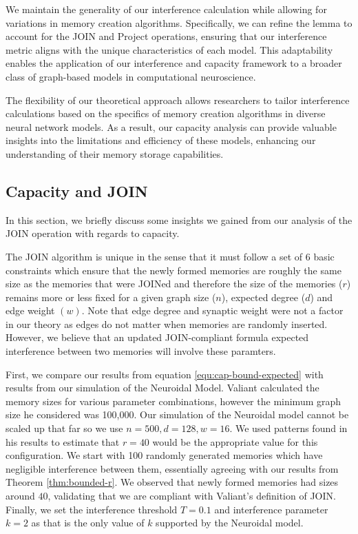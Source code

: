 We maintain the generality of our interference calculation while allowing for variations in memory creation algorithms. Specifically, we can refine the lemma to account for the JOIN and Project operations, ensuring that our interference metric aligns with the unique characteristics of each model. This adaptability enables the application of our interference and capacity framework to a broader class of graph-based models in computational neuroscience.

The flexibility of our theoretical approach allows researchers to tailor interference calculations based on the specifics of memory creation algorithms in diverse neural network models. As a result, our capacity analysis can provide valuable insights into the limitations and efficiency of these models, enhancing our understanding of their memory storage capabilities.

\subsection{Capacity and JOIN}

In this section, we briefly discuss some insights we gained from our analysis of the JOIN operation with regards to capacity. 

The JOIN algorithm is unique in the sense that it must follow a set of 6 basic constraints which ensure that the newly formed memories are roughly the same size as the memories that were JOINed and therefore the size of the memories ($r$) remains more or less fixed for a given graph size ($n$), expected degree ($d$) and edge weight $(w)$. Note that edge degree and synaptic weight were not a factor in our theory as edges do not matter when memories are randomly inserted. However, we believe that an updated JOIN-compliant formula expected interference between two memories will involve these paramters. 

First, we compare our results from equation \ref{equ:cap-bound-expected} with results from our simulation of the Neuroidal Model. Valiant calculated the memory sizes for various parameter combinations, however the minimum graph size he considered was 100,000. Our simulation of the Neuroidal model cannot be scaled up that far so we use $n = 500, d = 128, w = 16$. We used patterns found in his results to estimate that $r = 40$ would be the appropriate value for this configuration. We start with 100 randomly generated memories which have negligible interference between them, essentially agreeing with our results from Theorem \ref{thm:bounded-r}. We observed that newly formed memories had sizes around $40$, validating that we are compliant with Valiant's definition of JOIN. Finally, we set the interference threshold $T = 0.1$ and interference parameter $k = 2$ as that is the only value of $k$ supported by the Neuroidal model. 

